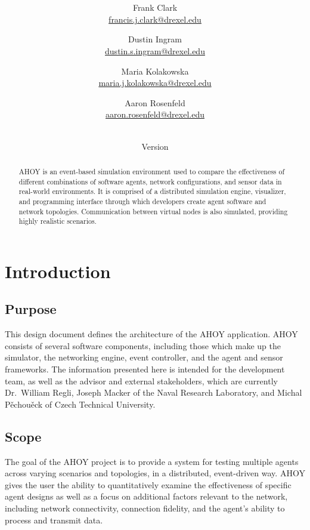 \documentclass[titlepage]{article}
\title{\textbf{\mytitle}}
\author{
	Frank Clark \\\url{francis.j.clark@drexel.edu}
    \and Dustin Ingram \\\url{dustin.s.ingram@drexel.edu}
	\and Maria Kolakowska \\\url{maria.j.kolakowska@drexel.edu}
    \and Aaron Rosenfeld \\\url{aaron.rosenfeld@drexel.edu}
}
\date{\mydate\\Version \myversion}
\begin{document}

\begin{figure}
    \centering
    \scalebox{0.8}{}
    \vspace{-4em}
\end{figure}

\maketitle

\begin{abstract}
AHOY is an event-based simulation environment used to compare the effectiveness of different combinations of software agents, network configurations, and sensor data in real-world environments.  It is comprised of a distributed simulation engine, visualizer, and programming interface through which developers create agent software and network topologies.  Communication between virtual nodes is also simulated, providing highly realistic scenarios.
\end{abstract}

\setcounter{tocdepth}{4}
\tableofcontents
\pagebreak
\listoffigures
\pagebreak
{}

\section{Introduction}
\subsection{Purpose}
This design document defines the architecture of the AHOY application. AHOY consists of several software components, including those which make up the simulator, the networking engine, event controller, and the agent and sensor frameworks. The information presented here is intended for the development team, as well as the advisor and external stakeholders, which are currently Dr.~William Regli, Joseph Macker of the Naval Research Laboratory, and Michal P\v{e}chou\v{e}ck of Czech Technical University. 

\subsection{Scope}
The goal of the AHOY project is to provide a system for testing multiple agents across varying scenarios and topologies, in a distributed, event-driven way. AHOY gives the user the ability to quantitatively examine the effectiveness of specific agent designs as well as a focus on additional factors relevant to the network, including network connectivity, connection fidelity, and the agent's ability to process and transmit data.
\end{document}
